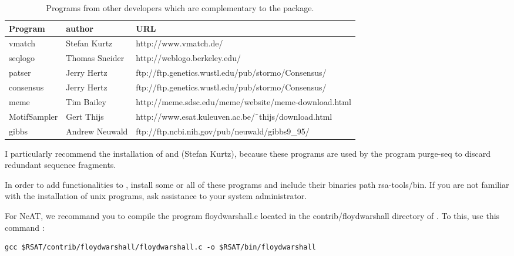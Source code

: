 \documentclass{book}
\begin{document}
\begin{table}
\begin{center}
\begin{tabular}{lll}
\hline
Program & author  & URL \\
\hline
vmatch & Stefan Kurtz & http://www.vmatch.de/ \\
seqlogo & Thomas Sneider & http://weblogo.berkeley.edu/ \\
patser & Jerry Hertz & ftp://ftp.genetics.wustl.edu/pub/stormo/Consensus/ \\
consensus & Jerry Hertz &  ftp://ftp.genetics.wustl.edu/pub/stormo/Consensus/ \\
meme & Tim Bailey & http://meme.sdsc.edu/meme/website/meme-download.html \\
MotifSampler & Gert Thijs & http://www.esat.kuleuven.ac.be/$\tilde{\hspace{0.4em}}$thijs/download.html \\
gibbs & Andrew Neuwald & ftp://ftp.ncbi.nih.gov/pub/neuwald/gibbs9\_95/ \\
\hline
\end{tabular}
\end{center}
\caption{\label{table:other_programs} Programs from other developers
  which are complementary to the \RSAT package.}
\end{table}

I particularly recommend the installation of  and
 (Stefan Kurtz), because these programs are used by
the program purge-seq to discard redundant sequence fragments.

In order to add functionalities to \RSAT, install some or all of these
programs and include their binaries path rsa-tools/bin. If you are not
familiar with the installation of unix programs, ask assistance to
your system administrator.

For NeAT, we recommand you to compile the program floydwarshall.c located in the contrib/floydwarshall directory of \RSAT. To this, use this command : 

\begin{verbatim}
gcc $RSAT/contrib/floydwarshall/floydwarshall.c -o $RSAT/bin/floydwarshall
\end{verbatim}






\end{document}
